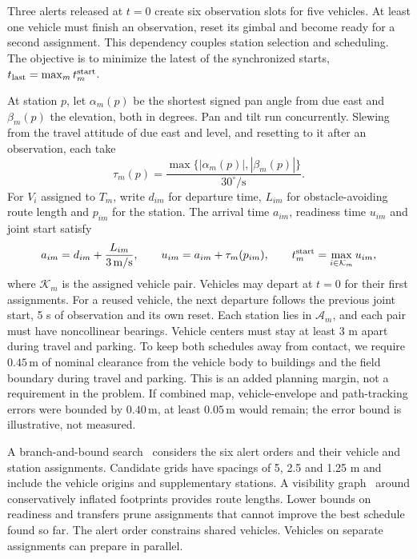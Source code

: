 \documentclass{swmcmthesis}
\begin{document}
Three alerts released at \(t=0\) create six observation slots for five vehicles. At least one vehicle must finish an observation, reset its gimbal and become ready for a second assignment. This dependency couples station selection and scheduling. The objective is to minimize the latest of the synchronized starts, \(t_{\rm last}=\max_m t_m^{\rm start}\).

At station \(p\), let \(\alpha_m(p)\) be the shortest signed pan angle from due east and \(\beta_m(p)\) the elevation, both in degrees. Pan and tilt run concurrently. Slewing from the travel attitude of due east and level, and resetting to it after an observation, each take
\begin{equation}
\label{eq:q22-slew-time}
\tau_m(p)=\frac{\max\{|\alpha_m(p)|,|\beta_m(p)|\}}{30^\circ/\mathrm s}.
\end{equation}
For \(V_i\) assigned to \(T_m\), write \(d_{im}\) for departure time, \(L_{im}\) for obstacle-avoiding route length and \(p_{im}\) for the station. The arrival time \(a_{im}\), readiness time \(u_{im}\) and joint start satisfy
\begin{equation}
\label{eq:q22-joint-start}
a_{im}=d_{im}+\frac{L_{im}}{3\,\mathrm{m/s}},\qquad
u_{im}=a_{im}+\tau_m(p_{im}),\qquad
t_m^{\rm start}=\max_{i\in\mathcal K_m} u_{im},
\end{equation}
where \(\mathcal K_m\) is the assigned vehicle pair. Vehicles may depart at \(t=0\) for their first assignments. For a reused vehicle, the next departure follows the previous joint start, 5 s of observation and its own reset. Each station lies in \(\mathcal A_m\), and each pair must have noncollinear bearings. Vehicle centers must stay at least 3 m apart during travel and parking.
To keep both schedules away from contact, we require \(0.45\,\mathrm m\) of nominal clearance from the vehicle body to buildings and the field boundary during travel and parking. This is an added planning margin, not a requirement in the problem. If combined map, vehicle-envelope and path-tracking errors were bounded by \(0.40\,\mathrm m\), at least \(0.05\,\mathrm m\) would remain; the error bound is illustrative, not measured.

A branch-and-bound search~\cite{ref:branch-and-bound} considers the six alert orders and their vehicle and station assignments. Candidate grids have spacings of 5, 2.5 and 1.25 m and include the vehicle origins and supplementary stations. A visibility graph~\cite{ref:visibility-graph} around conservatively inflated footprints provides route lengths. Lower bounds on readiness and transfers prune assignments that cannot improve the best schedule found so far. The alert order constrains shared vehicles. Vehicles on separate assignments can prepare in parallel.
\end{document}
